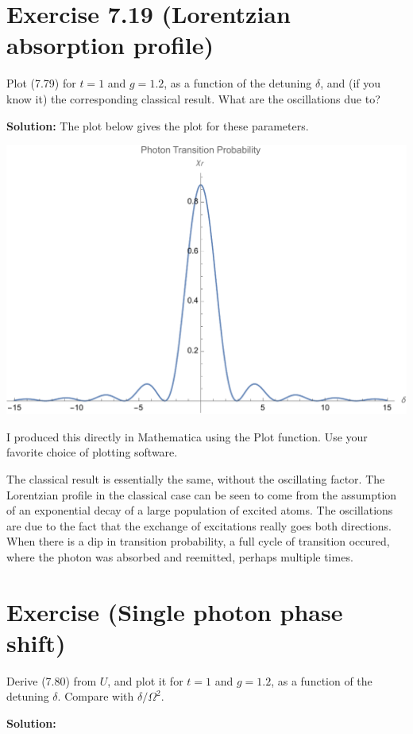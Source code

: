 \documentclass{book}
\begin{document}
\section*{Exercise 7.19 (Lorentzian absorption profile)}
    Plot (7.79) for $t = 1$ and $g = 1.2$, as a function of the detuning $\delta$, and (if you know it) the corresponding classical result. What are the oscillations due to?

    \textbf{Solution:} The plot below gives the plot for these parameters.
    \begin{center}
        \includegraphics{Exercise7.19.pdf}
    \end{center}
    I produced this directly in Mathematica using the Plot function. Use your favorite choice of plotting software.

    The classical result is essentially the same, without the oscillating factor. The Lorentzian profile in the classical case can be seen to come from the assumption of an exponential decay of a large population of excited atoms. The oscillations are due to the fact that the exchange of excitations really goes both directions. When there is a dip in transition probability, a full cycle of transition occured, where the photon was absorbed and reemitted, perhaps multiple times. 

\section*{Exercise (Single photon phase shift)}
    Derive (7.80) from $U$, and plot it for $t = 1$ and $g = 1.2$, as a function of the detuning $\delta$. Compare with $\delta/\Omega^2$.

    \textbf{Solution:}
    
\end{document}
